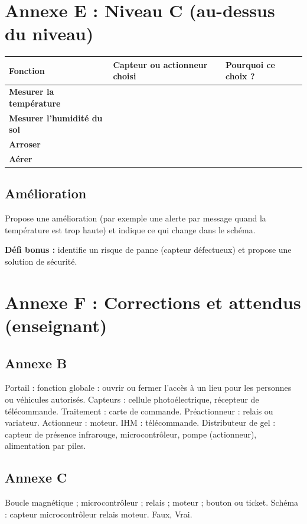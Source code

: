 \documentclass[11pt,a4paper]{article}
\begin{document}
\section*{Annexe E : Niveau C (au-dessus du niveau)}

\begin{tabularx}{\linewidth}{>{\bfseries}p{3.4cm}Y Y}
\toprule
Fonction & Capteur ou actionneur choisi & Pourquoi ce choix ?\\
\midrule
Mesurer la température & & \\
Mesurer l'humidité du sol & & \\
Arroser & & \\
Aérer & & \\
\bottomrule
\end{tabularx}

\subsection*{Amélioration}
Propose une amélioration (par exemple une alerte par message quand la température est trop haute) et indique ce qui change dans le schéma.\\
\lig \lig

\textbf{Défi bonus :} identifie un risque de panne (capteur défectueux) et propose une solution de sécurité.

\newpage
\section*{Annexe F : Corrections et attendus (enseignant)}

\subsection*{Annexe B}
Portail : fonction globale : ouvrir ou fermer l'accès à un lieu pour les personnes ou véhicules autorisés. Capteurs : cellule photoélectrique, récepteur de télécommande. Traitement : carte de commande. Préactionneur : relais ou variateur. Actionneur : moteur. IHM : télécommande. Distributeur de gel : capteur de présence infrarouge, microcontrôleur, pompe (actionneur), alimentation par piles.

\subsection*{Annexe C}
Boucle magnétique ; microcontrôleur ; relais ; moteur ; bouton ou ticket. Schéma : capteur \fl{} microcontrôleur \fl{} relais \fl{} moteur. Faux, Vrai.
\end{document}
